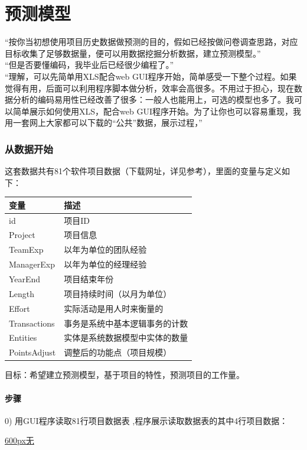 \chapter{预测模型} %

``按你当初想使用项目历史数据做预测的目的，假如已经按做问卷调查思路，对应目标收集了足够数据量，便可以用数据挖掘分析数据，建立预测模型。''\\
``但是否要懂编码，我毕业后已经很少编程了。''\\
``理解，可以先简单用XLS配合web
GUI程序开始，简单感受一下整个过程。如果觉得有用，后面可以利用程序脚本做分析，效率会高很多。不用过于担心，现在数据分析的编码易用性已经改善了很多：一般人也能用上，可选的模型也多了。我可以简单展示如何使用XLS，配合web
GUI程序开始。为了让你也可以容易重现，我用一套网上大家都可以下载的``公共''数据，展示过程，''\\

\hypertarget{ux4eceux6570ux636eux5f00ux59cb}{%
\subsection{从数据开始}\label{ux4eceux6570ux636eux5f00ux59cb}}

这套数据共有81个软件项目数据（下载网址，详见参考），里面的变量与定义如下：

\begin{longtable}[]{@{}ll@{}}
\toprule
变量 & 描述\tabularnewline
\midrule
\endhead
id & 项目ID\tabularnewline
Project & 项目信息\tabularnewline
TeamExp & 以年为单位的团队经验\tabularnewline
ManagerExp & 以年为单位的经理经验\tabularnewline
YearEnd & 项目结束年份\tabularnewline
Length & 项目持续时间（以月为单位）\tabularnewline
Effort & 实际活动是用人时来衡量的\tabularnewline
Transactions & 事务是系统中基本逻辑事务的计数\tabularnewline
Entities & 实体是系统数据模型中实体的数量\tabularnewline
PointsAdjust & 调整后的功能点（项目规模）\tabularnewline
\bottomrule
\end{longtable}

目标：希望建立预测模型，基于项目的特性，预测项目的工作量。

\hypertarget{ux6b65ux9aa4}{%
\subsubsection{步骤}\label{ux6b65ux9aa4}}

0) 用GUI程序读取81行项目数据表 ,程序展示读取数据表的其中4行项目数据：

\href{文件:Screenshotfrom2025-02-2621-07-23.png}{600px\textbar{}无}

